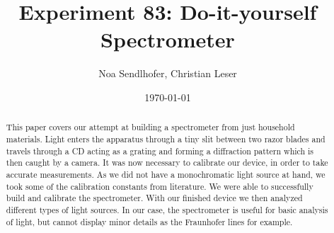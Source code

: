 \documentclass[12pt,a4paper]{article}
\title{Experiment 83: Do-it-yourself Spectrometer}
\author{Noa Sendlhofer, Christian Leser}
\date{\today}
\begin{document}
\maketitle


    

\begin{abstract}
    This paper covers our attempt at building a spectrometer from just household materials. 
    Light enters the apparatus through a tiny slit between two razor blades and travels through 
    a CD acting as a grating and forming a diffraction pattern which is then caught by a camera.
    It was now necessary to calibrate our device, in order to take accurate measurements. As we did not have a 
    monochromatic light source at hand, we took some of the calibration constants from literature.
    We were able to successfully build and calibrate the spectrometer. With our finished device we then analyzed
    different types of light sources. In our case, the spectrometer is useful for basic analysis of light,
    but cannot display minor details as the Fraunhofer lines for example.
\end{abstract}

\tableofcontents

\newpage



\newpage




\newpage


\end{document}
